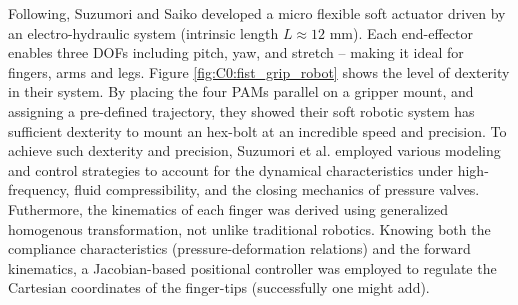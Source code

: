 Following, Suzumori and Saiko \cite{Suzumori1991,Suzumori1992} developed a micro flexible soft actuator driven by an electro-hydraulic system (intrinsic length $L \approx12$ \si{\milli \meter}). Each end-effector enables three DOFs including pitch, yaw, and stretch -- making it ideal for fingers, arms and legs. Figure \ref{fig:C0:fist_grip_robot} shows the level of dexterity in their system. By placing the four PAMs parallel on a gripper mount, and assigning a pre-defined trajectory, they showed their soft robotic system has sufficient dexterity to mount an hex-bolt at an incredible speed and precision. To achieve such dexterity and precision, Suzumori et al. \cite{Suzumori1991} employed various modeling and control strategies to account for the dynamical characteristics under high-frequency, fluid compressibility, and the closing mechanics of pressure valves. Futhermore, the kinematics of each finger was derived using generalized homogenous transformation, not unlike traditional robotics. Knowing both the compliance characteristics (pressure-deformation relations) and the forward kinematics, a Jacobian-based positional controller was employed to regulate the Cartesian coordinates of the finger-tips (successfully one might add).
%
